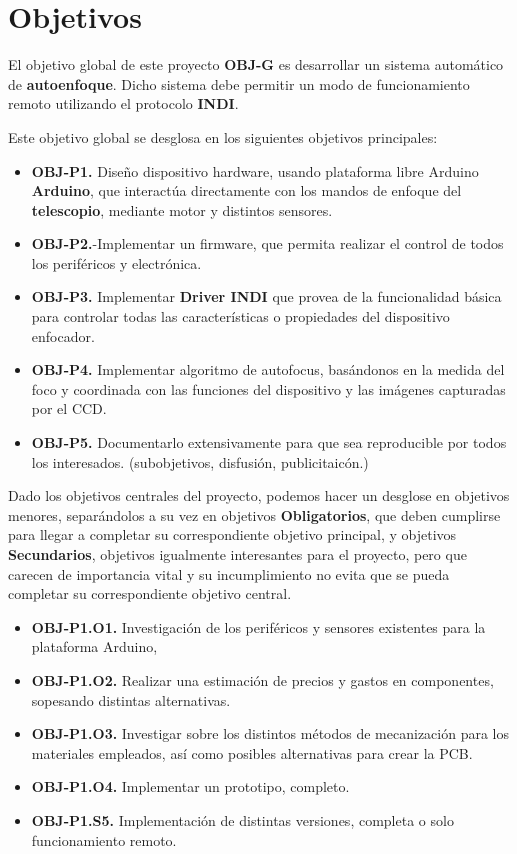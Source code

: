 \chapter{Objetivos}

El objetivo global de este proyecto \textbf{OBJ-G} es desarrollar un sistema automático de \textbf{autoenfoque}.
Dicho sistema debe permitir un modo de funcionamiento remoto utilizando el protocolo \textbf{INDI}.


\bigskip
Este objetivo global se desglosa en los siguientes objetivos principales:

\begin{itemize}
  \item \textbf{OBJ-P1.} Diseño dispositivo hardware, usando plataforma libre Arduino  \textbf{Arduino},
  que interactúa directamente con los mandos de enfoque del \textbf{telescopio}, mediante motor y distintos sensores.
  \item \textbf{OBJ-P2.}-Implementar un firmware, que permita realizar el control de todos los periféricos y electrónica.
  \item \textbf{OBJ-P3.} Implementar  \textbf{Driver INDI} que provea de la funcionalidad básica para controlar
   todas las características o propiedades del dispositivo enfocador.
  \item \textbf{OBJ-P4.} Implementar algoritmo de autofocus, basándonos en la medida del foco y
   coordinada con las funciones del dispositivo y las imágenes capturadas por el CCD.

\item \textbf{OBJ-P5.} Documentarlo extensivamente para que sea reproducible por todos los interesados. (subobjetivos, disfusión, publicitaicón.)

\end{itemize}


\bigskip
Dado los objetivos centrales del proyecto, podemos hacer un desglose en objetivos menores, separándolos a su vez en objetivos  \textbf{Obligatorios},
que deben cumplirse para llegar a completar su correspondiente objetivo principal,
y objetivos  \textbf{Secundarios}, objetivos igualmente interesantes para el proyecto, pero que carecen de importancia vital
y su incumplimiento no evita que se pueda completar su correspondiente objetivo central.

\begin{itemize}
  \item \textbf{OBJ-P1.O1.}  Investigación de los periféricos y sensores existentes para la plataforma Arduino,
  \item \textbf{OBJ-P1.O2.}  Realizar una estimación de precios y gastos en componentes, sopesando distintas alternativas.
  \item \textbf{OBJ-P1.O3.}  Investigar sobre los distintos métodos de mecanización para los materiales empleados, así como posibles alternativas para crear la PCB.
  \item \textbf{OBJ-P1.O4.}  Implementar un prototipo, completo.
  \item \textbf{OBJ-P1.S5.}  Implementación de distintas versiones, completa o solo funcionamiento remoto.
\end{itemize}



